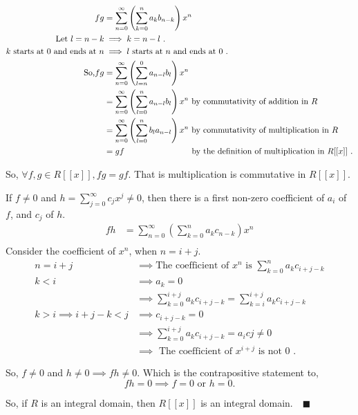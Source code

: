 \documentclass{article}
\begin{document}
\begin{align*}
  fg &= \sum_{n= 0}^{\infty} \left(
       \sum_{k=0}^n a_kb_{n-k}\right) x^n\\
  \text{Let } l= n-k &\implies  k = n-l\text{ .}\\
  k\text{ starts at } 0 \text{ and ends at } n&\implies l\text{ starts
                                                at } n \text{ and ends
                                                at } 0\text{ .}\\
  \text{So,} fg &= \sum_{n= 0}^{\infty} \left(
                 \sum_{l=n}^0 a_{n-l}b_{l}\right) x^n\\
  &= \sum_{n= 0}^{\infty} \left(
       \sum_{l=0}^n a_{n-l}b_{l}\right) x^n \text{ by commutativity of
    addition in }R\\
  &= \sum_{n= 0}^{\infty} \left(
       \sum_{l=0}^n b_{l}a_{n-l}\right) x^n \text{ by commutativity of
    multiplication in }R\\
  &= gf \hspace{7.75em}\text{ by the definition of multiplication in }R[[x]]\text{ .}
\end{align*}

So, $\forall f,g\in R[[x]], fg = gf$. That is multiplication is
commutative in $R[[x]].$

If $f\neq 0$ and $h = \sum_{j=0}^\infty c_j x^j\neq 0$, then there is
a first non-zero coefficient of
$a_i$ of $f$, and $c_j$ of $h$.
\begin{align*}
  fh &= \sum_{n= 0}^{\infty} \left(
       \sum_{k=0}^n a_kc_{n-k}\right) x^n\\
\end{align*}
Consider the coefficient of $x^n$, when $n = i+j$.
\begin{align*}
n = i+j &\implies \text{The coefficient of } x^n \text{ is
          } \sum_{k=0}^n a_kc_{i+j-k}\\
          k<i &\implies a_k = 0\\
              &\implies \sum_{k=0}^{i+j} a_kc_{i+j-k} =
                \sum_{k=i}^{i+j} a_kc_{i+j-k}\\
  k>i \implies i+j-k <j &\implies c_{i+j-k} = 0\\
        &\implies \sum_{k=0}^{i+j} a_kc_{i+j-k} = a_icj \neq 0\\
  &\implies \text{ The coefficient of } x^{i+j}\text{ is not } 0 \text{ .}
\end{align*}

So, $f\neq 0$ and $h\neq 0 \implies fh \neq 0$. Which is the
contrapositive statement to,
\[fh=0 \implies f = 0 \text{ or } h = 0.\]

So, if $R$ is an integral domain, then $R[[x]]$ is an integral
domain.$\quad \blacksquare$
\end{document}
